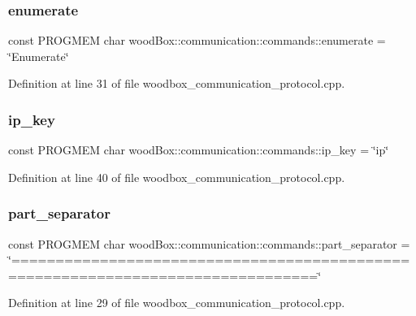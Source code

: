 \subsubsection{\texorpdfstring{enumerate}{enumerate}}
{\footnotesize\ttfamily const P\+R\+O\+G\+M\+EM char wood\+Box\+::communication\+::commands\+::enumerate = \char`\"{}Enumerate\char`\"{}}



Definition at line 31 of file woodbox\+\_\+communication\+\_\+protocol.\+cpp.

\mbox{\label{namespacewood_box_1_1communication_1_1commands_aae0ce9ea6660f4d4d6f24b69e27e62cd}} 
\subsubsection{\texorpdfstring{ip\+\_\+key}{ip\_key}}
{\footnotesize\ttfamily const P\+R\+O\+G\+M\+EM char wood\+Box\+::communication\+::commands\+::ip\+\_\+key = \char`\"{}ip\char`\"{}}



Definition at line 40 of file woodbox\+\_\+communication\+\_\+protocol.\+cpp.

\mbox{\label{namespacewood_box_1_1communication_1_1commands_a76851e1feab54d6c55c384d67bc4658d}} 
\subsubsection{\texorpdfstring{part\+\_\+separator}{part\_separator}}
{\footnotesize\ttfamily const P\+R\+O\+G\+M\+EM char wood\+Box\+::communication\+::commands\+::part\+\_\+separator = \char`\"{}================================================================================\char`\"{}}



Definition at line 29 of file woodbox\+\_\+communication\+\_\+protocol.\+cpp.

